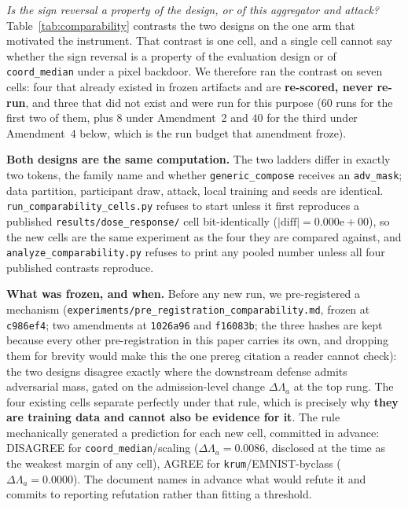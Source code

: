 \documentclass{article}
\begin{document}
\noindent \emph{Is the sign reversal a property of the design, or of this aggregator and attack?}
Table~\ref{tab:comparability} contrasts the two designs on the one arm that motivated the instrument. That contrast is one cell, and a single cell cannot say whether the sign reversal is a property of the evaluation design or of \texttt{coord\_median} under a pixel backdoor. We therefore ran the contrast on seven cells: four that already existed in frozen artifacts and are \textbf{re-scored, never re-run}, and three that did not exist and were run for this purpose ($60$ runs for the first two of them, plus $8$ under Amendment~2 and $40$ for the third under Amendment~4 below, which is the run budget that amendment froze).

\textbf{Both designs are the same computation.} The two ladders differ in exactly two tokens, the family name and whether \texttt{generic\_compose} receives an \texttt{adv\_mask}; data partition, participant draw, attack, local training and seeds are identical. \texttt{run\_comparability\_cells.py} refuses to start unless it first reproduces a published \texttt{results/dose\_response/} cell bit-identically ($|\text{diff}| = 0.000\mathrm{e}{+}00$), so the new cells are the same experiment as the four they are compared against, and \texttt{analyze\_comparability.py} refuses to print any pooled number unless all four published contrasts reproduce.

\textbf{What was frozen, and when.} Before any new run, we pre-registered a mechanism (\texttt{experiments/pre\_\allowbreak registration\_comparability.md}, frozen at \texttt{c986ef4}; two amendments at \texttt{1026a96} and \texttt{f16083b}; the three hashes are kept because every other pre-registration in this paper carries its own, and dropping them for brevity would make this the one prereg citation a reader cannot check): the two designs disagree exactly where the downstream defense admits adversarial mass, gated on the admission-level change $\Delta\Lambda_a$ at the top rung. The four existing cells separate perfectly under that rule, which is precisely why \textbf{they are training data and cannot also be evidence for it}. The rule mechanically generated a prediction for each new cell, committed in advance: DISAGREE for \texttt{coord\_median}/scaling ($\Delta\Lambda_a{=}0.0086$, disclosed at the time as the weakest margin of any cell), AGREE for \texttt{krum}/EMNIST-byclass ($\Delta\Lambda_a{=}0.0000$). The document names in advance what would refute it and commits to reporting refutation rather than fitting a threshold.
\end{document}
